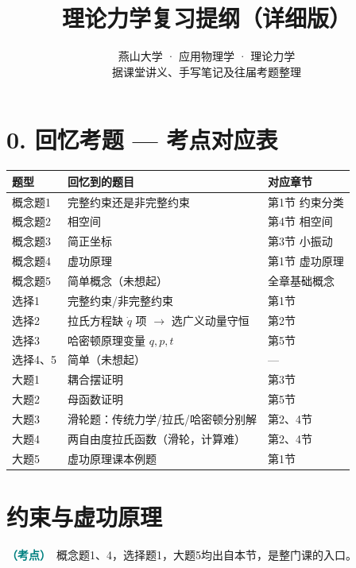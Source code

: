 \documentclass[UTF8,a4paper,11pt]{ctexart}
\title{\textbf{理论力学复习提纲（详细版）}}
\author{燕山大学 · 应用物理学 · 理论力学\\ 据课堂讲义、手写笔记及往届考题整理}
\date{}
\newcommand{\imp}[1]{\textcolor{teal}{\textbf{（考点）}}\ #1}
\begin{document}
\maketitle

\section*{0. 回忆考题 — 考点对应表}
\begin{center}
\begin{tabular}{|l|l|l|}
\hline
\textbf{题型} & \textbf{回忆到的题目} & \textbf{对应章节} \\
\hline
概念题1 & 完整约束还是非完整约束 & 第1节 约束分类 \\
概念题2 & 相空间 & 第4节 相空间 \\
概念题3 & 简正坐标 & 第3节 小振动 \\
概念题4 & 虚功原理 & 第1节 虚功原理 \\
概念题5 & 简单概念（未想起） & 全章基础概念 \\
\hline
选择1 & 完整约束/非完整约束 & 第1节 \\
选择2 & 拉氏方程缺 $\dot q$ 项 $\rightarrow$ 选广义动量守恒 & 第2节 \\
选择3 & 哈密顿原理变量 $q,p,t$ & 第5节 \\
选择4、5 & 简单（未想起） & — \\
\hline
大题1 & 耦合摆证明 & 第3节 \\
大题2 & 母函数证明 & 第5节 \\
大题3 & 滑轮题：传统力学/拉氏/哈密顿分别解 & 第2、4节 \\
大题4 & 两自由度拉氏函数（滑轮，计算难） & 第2、4节 \\
大题5 & 虚功原理课本例题 & 第1节 \\
\hline
\end{tabular}
\end{center}

\tableofcontents
\newpage

\section{约束与虚功原理}
\imp{概念题1、4，选择题1，大题5均出自本节，是整门课的入口。}
\end{document}
